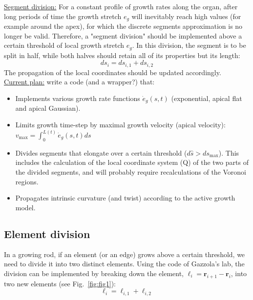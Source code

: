 \documentclass[a4paper, 11pt]{article}
\begin{document}
\noindent \underline{Segment division:} For a constant profile of growth rates along the organ, after long periods of time the growth stretch $e_g$ will inevitably reach high values (for example around the apex), for which the discrete segments approximation is no longer be valid. Therefore, a "segment division" should be implemented above a certain threshold of local growth stretch $e_g$. In this division, the segment is to be split in half, while both halves should retain all of its properties but its length:
\begin{equation}
    ds_i=ds_{i,1}+ds_{i,2}
\end{equation}
The propagation of the local coordinates should be updated accordingly.
\\

\noindent \underline{Current plan:} write a code (and a wrapper?) that: 
\begin{itemize}
    \item Implements various growth rate functions $\dot{e}_g(s,t)$ (exponential, apical flat and apical Gaussian). 
    \item Limits growth time-step by maximal growth velocity (apical velocity): $v_{\text{max}}=\int_0^{L(t)}\dot{e}_g(s,t)ds$ 
    \item Divides segments that elongate over a certain threshold ($d\hat{s}>ds_{\text{max}}$). This includes the calculation of the local coordinate system (Q) of the two parts of the divided segments, and will probably require recalculations of the Voronoi regions.
    \item Propagates intrinsic curvature (and twist) according to the active growth model.
\end{itemize}



\newpage

\subsection*{Element division}
In a growing rod, if an element (or an edge) grows above a certain threshold, we need to divide it into two distinct elements. Using the code of Gazzola's lab, the division can be implemented by breaking down the element, $\boldsymbol{\ell}_i=\boldsymbol{r}_{i+1}-\boldsymbol{r}_{i}$, into two new elements (see Fig.~\ref{fig:fig1}):
\begin{equation}
    \boldsymbol{\ell}_i=\boldsymbol{\ell}_{i,1}+\boldsymbol{\ell}_{i,2}
\end{equation}
\end{document}
